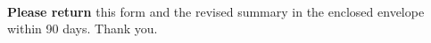\documentclass[letterpaper,12pt]{letter}
\begin{document}
\vspace{12pt}

\makebox[6.5in]{\hrulefill} \\
\makebox[6.5in]{\hrulefill} \\
\makebox[6.5in]{\hrulefill} \\
\makebox[6.5in]{\hrulefill} \\
\makebox[6.5in]{\hrulefill} \\
\makebox[6.5in]{\hrulefill} \\
\makebox[6.5in]{\hrulefill} \\
\makebox[6.5in]{\hrulefill} \\
\makebox[6.5in]{\hrulefill} \\
\makebox[6.5in]{\hrulefill} \\
\makebox[6.5in]{\hrulefill} \\
\makebox[6.5in]{\hrulefill} \\
\makebox[6.5in]{\hrulefill} \\
\makebox[6.5in]{\hrulefill}

\vspace{12pt}

\textbf{Please return} this form and the revised summary in the enclosed 
envelope within 90 days.  Thank you.

\vfill
\end{document}
